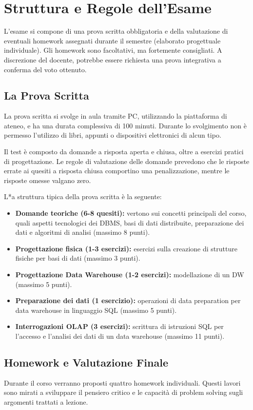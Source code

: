 \section*{Struttura e Regole dell'Esame}
L'esame si compone di una prova scritta obbligatoria e della valutazione di eventuali homework assegnati durante il semestre (elaborato progettuale individuale). Gli homework sono facoltativi, ma fortemente consigliati. A discrezione del docente, potrebbe essere richiesta una prova integrativa a conferma del voto ottenuto.

\subsection*{La Prova Scritta}
La prova scritta si svolge in aula tramite PC, utilizzando la piattaforma di ateneo, e ha una durata complessiva di 100 minuti. Durante lo svolgimento non è permesso l'utilizzo di libri, appunti o dispositivi elettronici di alcun tipo.

Il test è composto da domande a risposta aperta e chiusa, oltre a esercizi pratici di progettazione. Le regole di valutazione delle domande prevedono che le risposte errate ai quesiti a risposta chiusa comportino una penalizzazione, mentre le risposte omesse valgano zero.

L*a struttura tipica della prova scritta è la seguente:
\begin{itemize}
    \item \textbf{Domande teoriche (6-8 quesiti):} vertono sui concetti principali del corso, quali aspetti tecnologici dei DBMS, basi di dati distribuite, preparazione dei dati e algoritmi di analisi (massimo 8 punti).
    \item \textbf{Progettazione fisica (1-3 esercizi):} esercizi sulla creazione di strutture fisiche per basi di dati (massimo 3 punti).
    \item \textbf{Progettazione Data Warehouse (1-2 esercizi):} modellazione di un DW (massimo 5 punti).
    \item \textbf{Preparazione dei dati (1 esercizio):} operazioni di data preparation per data warehouse in linguaggio SQL (massimo 5 punti).
    \item \textbf{Interrogazioni OLAP (3 esercizi):} scrittura di istruzioni SQL per l'accesso e l'analisi dei dati di un data warehouse (massimo 11 punti).
\end{itemize}

\subsection*{Homework e Valutazione Finale}
Durante il corso verranno proposti quattro homework individuali. Questi lavori sono mirati a sviluppare il pensiero critico e le capacità di problem solving sugli argomenti trattati a lezione. 


